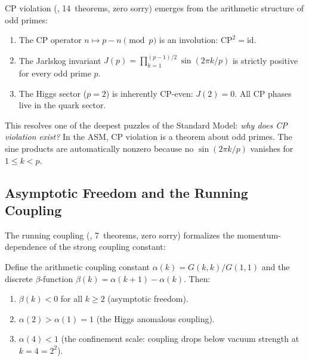 CP violation (, 14~theorems, zero sorry)
emerges from the arithmetic structure of odd primes:

\begin{theorem}
\leavevmode
\begin{enumerate}
  \item The CP operator $n \mapsto p - n \pmod{p}$ is an involution:
    $\mathrm{CP}^2 = \mathrm{id}$.
  \item The Jarlskog invariant $J(p) = \prod_{k=1}^{(p-1)/2} \sin(2\pi k/p)$
    is strictly positive for every odd prime $p$.
  \item The Higgs sector ($p = 2$) is inherently CP-even:
    $J(2) = 0$. All CP phases live in the quark sector.
\end{enumerate}
\end{theorem}

This resolves one of the deepest puzzles of the Standard Model:
\emph{why does CP violation exist?} In the ASM, CP violation is a
theorem about odd primes. The sine products are automatically
nonzero because no $\sin(2\pi k/p)$ vanishes for $1 \leq k < p$.

\subsection{Asymptotic Freedom and the Running Coupling}
\label{sec:running-coupling}

The running coupling (, 7~theorems,
zero sorry) formalizes the momentum-dependence of the strong
coupling constant:

\begin{theorem}
Define the arithmetic coupling constant $\alpha(k) = G(k,k)/G(1,1)$
and the discrete $\beta$-function $\beta(k) = \alpha(k+1) - \alpha(k)$.
Then:
\begin{enumerate}
  \item $\beta(k) < 0$ for all $k \geq 2$ (asymptotic freedom).
  \item $\alpha(2) > \alpha(1) = 1$ (the Higgs anomalous coupling).
  \item $\alpha(4) < 1$ (the confinement scale: coupling drops
    below vacuum strength at $k = 4 = 2^2$).
\end{enumerate}
\end{theorem}

